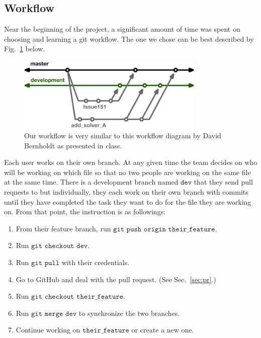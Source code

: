 \documentclass{article}
\begin{document}
\subsection{Workflow}
Near the beginning of the project, a significant amount of time was spent on choosing and learning a git workflow.  The one we chose can be best described by Fig.~\ref{fig:wf} below.  
\begin{figure}[ht]
    \centering
    \includegraphics[width=0.8\textwidth]{index.png}
    \caption{Our workflow is very similar to this workflow diagram by David Bernholdt as presented in class.}
    \label{fig:wf}
\end{figure}

Each user works on their own branch.  At any given time the team decides on who will be working on which file so that no two people are working on the same file at the same time.  There is a development branch named $\texttt{dev}$ that they send pull requests to but individually, they each work on their own branch with commits until they have completed the task they want to do for the file they are working on.  From that point, the instruction is as followings:

\begin{enumerate}
    \item From their feature branch, run $\texttt{git push origin their\_feature}$.
    \item Run $\texttt{git checkout dev}$.
    \item Run $\texttt{git pull}$ with their credentials.
    \item Go to GitHub and deal with the pull request. (See Sec.~\ref{sec:pr}.)
    \item Run $\texttt{git checkout their\_feature}$.
    \item Run $\texttt{git merge dev}$ to synchronize the two branches.
    \item Continue working on $\texttt{their\_feature}$ or create a new one.
\end{enumerate}
\end{document}
